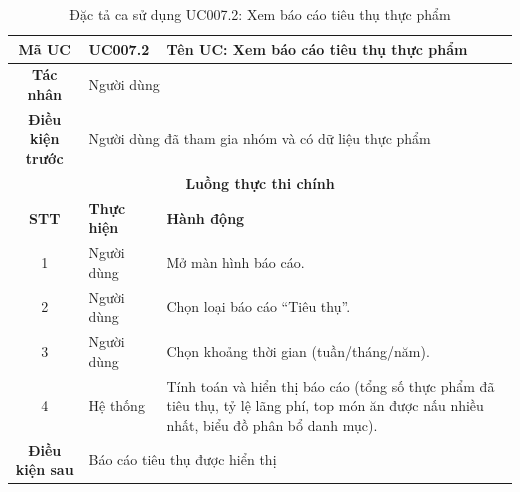 \begin{table}[H]
    \centering
    \label{tab:uc007-2}
    \begin{tabularx}{\textwidth}{|c|p{3.5cm}|X|}
        \hline
        \rowcolor{headergreen} 
        \textbf{Mã UC} & \textbf{UC007.2} & \textbf{Tên UC: Xem báo cáo tiêu thụ thực phẩm} \\ \hline
        \textbf{Tác nhân} & \multicolumn{2}{l|}{Người dùng} \\ \hline
        \textbf{Điều kiện trước} & \multicolumn{2}{X|}{Người dùng đã tham gia nhóm và có dữ liệu thực phẩm} \\ \hline
        
        \multicolumn{3}{|c|}{\cellcolor{headerorange}\textbf{Luồng thực thi chính}} \\ \hline
        \rowcolor{graybg} \textbf{STT} & \textbf{Thực hiện} & \textbf{Hành động} \\ \hline
        1 & Người dùng & Mở màn hình báo cáo. \\ \hline
        2 & Người dùng & Chọn loại báo cáo ``Tiêu thụ''. \\ \hline
        3 & Người dùng & Chọn khoảng thời gian (tuần/tháng/năm). \\ \hline
        4 & Hệ thống & Tính toán và hiển thị báo cáo (tổng số thực phẩm đã tiêu thụ, tỷ lệ lãng phí, top món ăn được nấu nhiều nhất, biểu đồ phân bổ danh mục). \\ \hline
        
        \textbf{Điều kiện sau} & \multicolumn{2}{X|}{Báo cáo tiêu thụ được hiển thị} \\ \hline
    \end{tabularx}
    \caption{Đặc tả ca sử dụng UC007.2: Xem báo cáo tiêu thụ thực phẩm}
\end{table}

